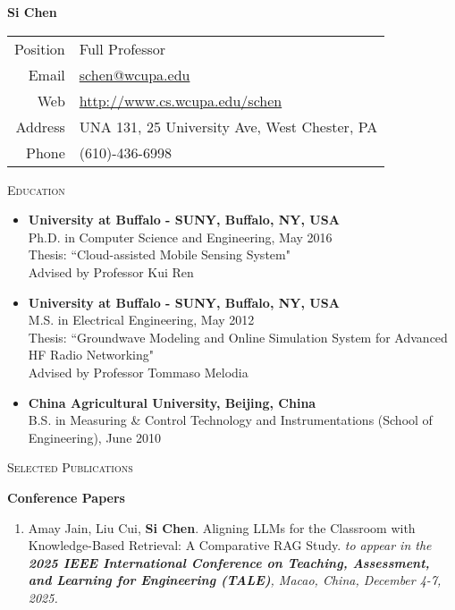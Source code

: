 \documentclass[letter]{article}
\newcommand{\heading}[1]{\item \large \textsc{#1} \normalsize}
\newcommand{\publication}[4]{\item #1. #2. \emph{#3.} #4}
\begin{document}
\Huge \textbf{Si Chen} \hfill \small
\begin{tabular}{rl}
Position & Full Professor\\
Email   & \href{mailto:schen@wcupa.edu}{schen@wcupa.edu} \\
Web     & \url{http://www.cs.wcupa.edu/schen} \\
Address & UNA 131, 25 University Ave, West Chester, PA\\
Phone  & (610)-436-6998\\
\end{tabular}

\normalsize

\begin{description}

\heading{Education}

\begin{itemize}
\item \textbf{University at Buffalo - SUNY, Buffalo, NY, USA} \\
Ph.D. in Computer Science and Engineering, May 2016\\
Thesis: ``Cloud-assisted Mobile Sensing System" \\
Advised by Professor Kui Ren

\item \textbf{University at Buffalo - SUNY, Buffalo, NY, USA} \\
M.S. in Electrical Engineering, May 2012\\
Thesis: ``Groundwave Modeling and Online Simulation System for Advanced HF Radio Networking" \\
Advised by Professor Tommaso Melodia

\item \textbf{China Agricultural University, Beijing, China} \\
B.S. in Measuring \& Control Technology and Instrumentations (School of Engineering), June 2010\\
\end{itemize}

\heading{Selected Publications}

\textbf{Conference Papers}

\begin{enumerate}[{C-}1.]

\publication{Amay Jain, Liu Cui, \textbf{Si Chen}}
            {Aligning LLMs for the Classroom with Knowledge-Based Retrieval: A Comparative RAG Study}
            {\textit{to appear in} the \textbf{2025 IEEE International Conference on Teaching, Assessment, and Learning for Engineering (TALE)}, Macao, China, December 4-7, 2025}\\
            

\end{enumerate}
\end{description}
\end{document}
